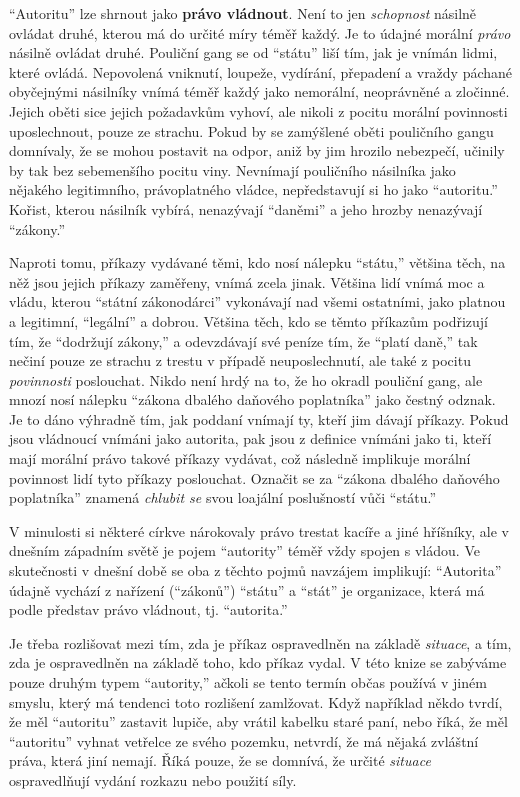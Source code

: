 \documentclass{book}
\begin{document}
\enquote{Autoritu} lze shrnout jako \textbf{právo vládnout}. Není to jen \emph{schopnost} násilně ovládat druhé, kterou má do určité míry téměř každý. Je to údajné morální \emph{právo} násilně ovládat druhé. Pouliční gang se od \enquote{státu} liší tím, jak je vnímán lidmi, které ovládá. Nepovolená vniknutí, loupeže, vydírání, přepadení a vraždy páchané obyčejnými násilníky vnímá téměř každý jako nemorální, neoprávněné a zločinné. Jejich oběti sice jejich požadavkům vyhoví, ale nikoli z pocitu morální povinnosti uposlechnout, pouze ze strachu. Pokud by se zamýšlené oběti pouličního gangu domnívaly, že se mohou postavit na odpor, aniž by jim hrozilo nebezpečí, učinily by tak bez sebemenšího pocitu viny. Nevnímají pouličního násilníka jako nějakého legitimního, právoplatného vládce, nepředstavují si ho jako \enquote{autoritu.} Kořist, kterou násilník vybírá, nenazývají \enquote{daněmi} a jeho hrozby nenazývají \enquote{zákony.}

Naproti tomu, příkazy vydávané těmi, kdo nosí nálepku \enquote{státu,} většina těch, na něž jsou jejich příkazy zaměřeny, vnímá zcela jinak. Většina lidí vnímá moc a vládu, kterou \enquote{státní zákonodárci} vykonávají nad všemi ostatními, jako platnou a legitimní, \enquote{legální} a dobrou. Většina těch, kdo se těmto příkazům podřizují tím, že \enquote{dodržují zákony,} a odevzdávají své peníze tím, že \enquote{platí daně,} tak nečiní pouze ze strachu z trestu v případě neuposlechnutí, ale také z pocitu \emph{povinnosti} poslouchat. Nikdo není hrdý na to, že ho okradl pouliční gang, ale mnozí nosí nálepku \enquote{zákona dbalého daňového poplatníka} jako čestný odznak. Je to dáno výhradně tím, jak poddaní vnímají ty, kteří jim dávají příkazy. Pokud jsou vládnoucí vnímáni jako autorita, pak jsou z definice vnímáni jako ti, kteří mají morální právo takové příkazy vydávat, což následně implikuje morální povinnost lidí tyto příkazy poslouchat. Označit se za \enquote{zákona dbalého daňového poplatníka} znamená \emph{chlubit se} svou loajální poslušností vůči \enquote{státu.}

V minulosti si některé církve nárokovaly právo trestat kacíře a jiné hříšníky, ale v dnešním západním světě je pojem \enquote{autority} téměř vždy spojen s vládou. Ve skutečnosti v dnešní době se oba z těchto pojmů navzájem implikují: \enquote{Autorita} údajně vychází z nařízení (\enquote{zákonů}) \enquote{státu} a \enquote{stát} je organizace, která má podle představ právo vládnout, tj. \enquote{autorita.}

Je třeba rozlišovat mezi tím, zda je příkaz ospravedlněn na základě \emph{situace}, a tím, zda je ospravedlněn na základě toho, kdo příkaz vydal. V této knize se zabýváme pouze druhým typem \enquote{autority,} ačkoli se tento termín občas používá v jiném smyslu, který má tendenci toto rozlišení zamlžovat. Když například někdo tvrdí, že měl \enquote{autoritu} zastavit lupiče, aby vrátil kabelku staré paní, nebo říká, že měl \enquote{autoritu} vyhnat vetřelce ze svého pozemku, netvrdí, že má nějaká zvláštní práva, která jiní nemají. Říká pouze, že se domnívá, že určité \emph{situace} ospravedlňují vydání rozkazu nebo použití síly.
\end{document}
